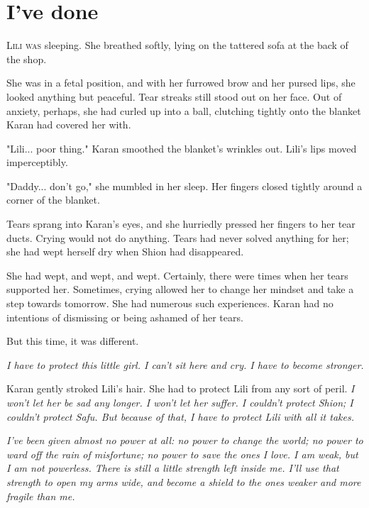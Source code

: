 
\chapter{I've done}


\lettrine{L}{ili was} sleeping. She breathed softly, lying on the tattered sofa at
the back of the shop.

She was in a fetal position, and with her furrowed brow and her pursed
lips, she looked anything but peaceful. Tear streaks still stood out on
her face. Out of anxiety, perhaps, she had curled up into a ball,
clutching tightly onto the blanket Karan had covered her with.

"Lili... poor thing." Karan smoothed the blanket's wrinkles out. Lili's
lips moved imperceptibly.

"Daddy... don't go," she mumbled in her sleep. Her fingers closed
tightly around a corner of the blanket.

Tears sprang into Karan's eyes, and she hurriedly pressed her fingers to
her tear ducts. Crying would not do anything. Tears had never solved
anything for her; she had wept herself dry when Shion had disappeared.

She had wept, and wept, and wept. Certainly, there were times when her
tears supported her. Sometimes, crying allowed her to change her mindset
and take a step towards tomorrow. She had numerous such experiences.
Karan had no intentions of dismissing or being ashamed of her tears.

But this time, it was different.

\emph{I have to protect this little girl. I can't sit here and cry. I have to
become stronger.}

Karan gently stroked Lili's hair. She had to protect Lili from any sort
of peril. \emph{I won't let her be sad any longer. I won't let her suffer. I
couldn't protect Shion; I couldn't protect Safu. But because of that, I
have to protect Lili with all it takes.}

\emph{I've been given almost no power at all: no power to change the world; no
power to ward off the rain of misfortune; no power to save the ones I
love. I am weak, but I am not powerless. There is still a little
strength left inside me. I'll use that strength to open my arms wide,
and become a shield to the ones weaker and more fragile than me.}

